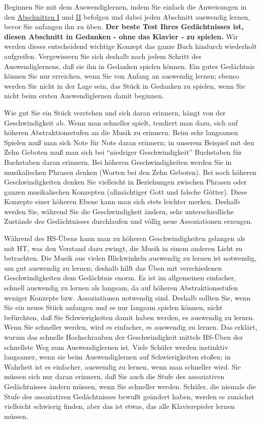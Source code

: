 Beginnen Sie mit dem Auswendiglernen, indem Sie einfach die Anweisungen in den \hyperlink{c1i1}{Abschnitten I} und \hyperlink{c1ii1}{II} befolgen und dabei jeden Abschnitt auswendig lernen, bevor Sie anfangen ihn zu üben.
\textbf{Der beste Test Ihres Gedächtnisses ist, diesen Abschnitt in Gedanken - ohne das Klavier - zu spielen.}
Wir werden dieses entscheidend wichtige Konzept das ganze Buch hindurch wiederholt aufgreifen.
Vergewissern Sie sich deshalb nach jedem Schritt des Auswendiglernens, daß sie ihn in Gedanken spielen können.
Ein gutes Gedächtnis können Sie nur erreichen, wenn Sie von Anfang an auswendig lernen; ebenso werden Sie nicht in der Lage sein, das Stück in Gedanken zu spielen, wenn Sie nicht beim ersten Auswendiglernen damit beginnen.

Wie gut Sie ein Stück verstehen und sich daran erinnern, hängt von der Geschwindigkeit ab.
Wenn man schneller spielt, tendiert man dazu, sich auf höheren Abstraktionsstufen an die Musik zu erinnern.
Beim sehr langsamen Spielen muß man sich Note für Note daran erinnern; in unserem Beispiel mit den Zehn Geboten muß man sich bei \enquote{niedriger Geschwindigkeit} Buchstaben für Buchstaben daran erinnern.
Bei höheren Geschwindigkeiten werden Sie in musikalischen Phrasen denken (Worten bei den Zehn Geboten).
Bei noch höheren Geschwindigkeiten denken Sie vielleicht in Beziehungen zwischen Phrasen oder ganzen musikalischen Konzepten (allmächtiger Gott und falsche Götter).
Diese Konzepte einer höheren Ebene kann man sich stets leichter merken.
Deshalb werden Sie, während Sie die Geschwindigkeit ändern, sehr unterschiedliche Zustände des Gedächtnisses durchlaufen und völlig neue Assoziationen erzeugen.

Während des HS-Übens kann man zu höheren Geschwindigkeiten gelangen als mit HT, was den Verstand dazu zwingt, die Musik in einem anderen Licht zu betrachten.
Die Musik aus vielen Blickwinkeln auswendig zu lernen ist notwendig, um gut auswendig zu lernen; deshalb hilft das Üben mit verschiedenen Geschwindigkeiten dem Gedächtnis enorm.
Es ist im allgemeinen einfacher, schnell auswendig zu lernen als langsam, da auf höheren Abstraktionsstufen weniger Konzepte bzw. Assoziationen notwendig sind.
Deshalb sollten Sie, wenn Sie ein neues Stück anfangen und es nur langsam spielen können, nicht befürchten, daß Sie Schwierigkeiten damit haben werden, es auswendig zu lernen.
Wenn Sie schneller werden, wird es einfacher, es auswendig zu lernen.
Das erklärt, warum das schnelle Hochschrauben der Geschwindigkeit mittels HS-Üben der schnellste Weg zum Auswendiglernen ist.
Viele Schüler werden instinktiv langsamer, wenn sie beim Auswendiglernen auf Schwierigkeiten stoßen; in Wahrheit ist es einfacher, auswendig zu lernen, wenn man schneller wird.
Sie müssen sich nur daran erinnern, daß Sie auch die Stufe des assoziativen Gedächtnisses ändern müssen, wenn Sie schneller werden.
Schüler, die niemals die Stufe des assoziativen Gedächtnisses bewußt geändert haben, werden es zunächst vielleicht schwierig finden, aber das ist etwas, das alle Klavierspieler lernen müssen.

